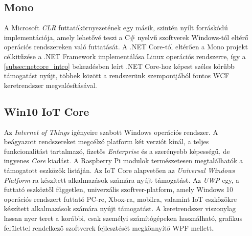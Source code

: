 \subsection{Mono}

A Microsoft \emph{CLR} futtatókörnyezetének egy másik, szintén nyílt forráskódú implementációja, amely lehetővé teszi a C\# nyelvű szoftverek Windows-tól eltérő operációs rendszereken való futtatását. A .NET Core-tól eltérően a Mono projekt célkitűzése a .NET Framework implementálása Linux operációs rendszerre, így a \ref{subsec:netcore_intro} bekezdésben leírt .NET Core-hoz képest széles körűbb támogatást nyújt, többek között a rendszerünk szempontjából fontos WCF keretrendszer megvalósításával.

\subsection{Win10 IoT Core}

Az \emph{Internet of Things} igényeire szabott Windows operációs rendszer. A beágyazott rendszereket megcélzó platform két verziót kínál, a teljes funkcionalitást tartalmazó, fizetős \emph{Enterprise} és a szerényebb képességű, de ingyenes \emph{Core} kiadást. A Raspberry Pi modulok természetesen megtalálhatók a támogatott eszközök listáján. Az IoT Core alapvetően az \emph{Universal Windows Platform}-ra készített alkalmazások számára nyújt támogatást. Az \emph{UWP} egy, a futtató eszköztől független, univerzális szoftver-platform, amely Windows 10 operációs rendszert futtató PC-re, Xbox-ra, mobilra, valamint IoT eszközökre készített alkalmazások számára nyújt támogatást. A keretrendszer viszonylag lassan nyer teret a korábbi, csak személyi számítógépeken használható, grafikus felülettel rendelkező szoftverek fejlesztését megkönnyítő WPF mellett.

